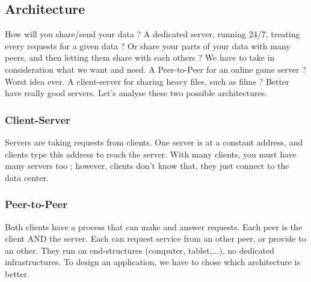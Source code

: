 \documentclass[12pt,a4paper]{article}
\begin{document}
\subsection{Architecture}
How will you share/send your data ? A dedicated server, running 24/7, treating every requests for a given data ? Or share your parts of your data with many peers, and then letting them share with each others ? We have to take in consideration what we want and need. A Peer-to-Peer for an online game server ? Worst idea ever. A client-server for sharing heavy files, such as films ? Better have really good servers. Let's analyse these two possible architectures.
\subsubsection{Client-Server}
Servers are taking requests from clients. One server is at a constant address, and clients type this address to reach the server. With many clients, you must have many servers too ; however, clients don't know that, they just connect to the data center. 

\subsubsection{Peer-to-Peer}
Both clients have a process that can make and answer requests. Each peer is the client AND the server. Each can request service from an other peer, or provide to an other. They run on end-structures (computer, tablet,...), no dedicated infrastructures. To design an application, we have to chose which architecture is better.
\end{document}
